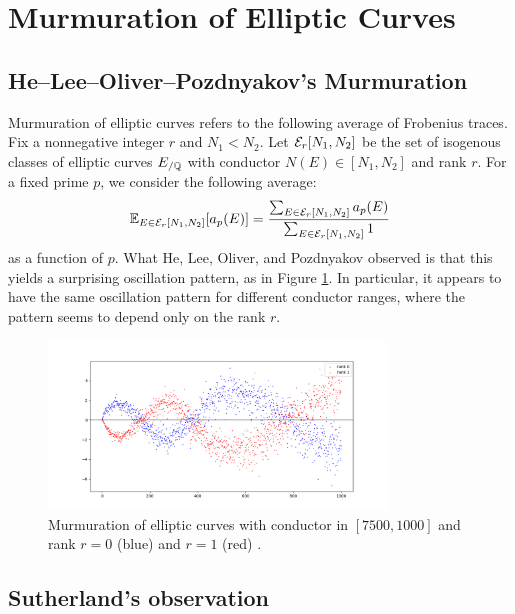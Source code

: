 \section{Murmuration of Elliptic Curves}
\label{sec:elliptic}

\subsection{He--Lee--Oliver--Pozdnyakov's Murmuration}
\label{subsec:elliptic_hlop}

Murmuration of elliptic curves refers to the following average of Frobenius traces.
Fix a nonnegative integer $r$ and $N_1 < N_2$.
Let $\mathcal{E}_r[N_1, N_2]$ be the set of isogenous classes of elliptic curves $E_{/\mathbb{Q}}$ with conductor $N(E) \in [N_1, N_2]$ and rank $r$.
For a fixed prime $p$, we consider the following average:
\begin{equation}
    \mathbb{E}_{E \in \mathcal{E}_r[N_1, N_2]} [a_p(E)] = \frac{\sum_{E \in \mathcal{E}_r[N_1, N_2]} a_p(E)}{\sum_{E \in \mathcal{E}_r[N_1, N_2]} 1}
\end{equation}
as a function of $p$.
What He, Lee, Oliver, and Pozdnyakov \cite{he2024murmurations} observed is that this yields a surprising oscillation pattern, as in Figure \ref{fig:hlop}.
In particular, it appears to have the same oscillation pattern for different conductor ranges, where the pattern seems to depend only on the rank $r$.

\begin{figure}[htp] 
\centering
    \includegraphics[width=0.8\textwidth]{src/hlop_fig1.png}%
    \caption{Murmuration of elliptic curves with conductor in $[7500, 1000]$ and rank $r = 0$ (blue) and $r = 1$ (red) \cite{he2024murmurations}.}
\label{fig:hlop}
\end{figure}


\subsection{Sutherland's observation}
\label{subsec:elliptic_sutherland}

